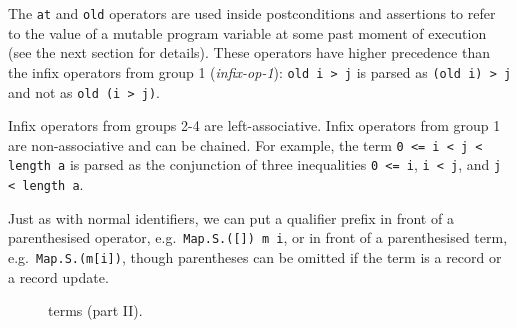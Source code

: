The \texttt{at} and \texttt{old} operators are used inside
postconditions and assertions to refer to the value of
a mutable program variable at some past moment of execution
(see the next section for details).
These operators have higher precedence than the infix
operators from group 1 (\textsl{infix-op-1}): \texttt{old i > j}
is parsed as \texttt{(old i) > j} and not as \texttt{old (i > j)}.

Infix operators from groups 2-4 are left-associative.
Infix operators from group 1 are non-associative and
can be chained. For example, the term \texttt{0 <= i < j < length a}
is parsed as the conjunction of three inequalities \texttt{0 <= i},
\texttt{i < j}, and \texttt{j < length a}.

Just as with normal identifiers,
we can put a qualifier prefix in front of a parenthesised operator,
e.g.~\texttt{Map.S.([]) m i}, or in front of a parenthesised term,
e.g.~\texttt{Map.S.(m[i])}, though parentheses can be omitted
if the term is a record or a record update.

\begin{figure}[ht]
\begin{center}\end{center}
\caption{\whyml terms (part II).}
\label{fig:bnf:term2}
\end{figure}

